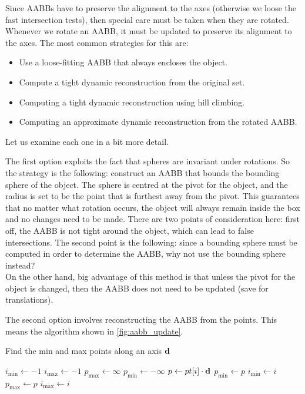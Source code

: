     Since AABBs have to preserve the alignment to the axes (otherwise we loose
    the fast intersection tests), then special care must be taken when they are
    rotated. Whenever we rotate an AABB, it must be updated to preserve its
    alignment to the axes. The most common strategies for this are:

    \begin{itemize}
      \item Use a loose-fitting AABB that always encloses the object.
      \item Compute a tight dynamic reconstruction from the original set.
      \item Computing a tight dynamic reconstruction using hill climbing.
      \item Computing an approximate dynamic reconstruction from the
        rotated AABB.
    \end{itemize}
    Let us examine each one in a bit more detail.

    The first option exploits the fact that spheres are invariant under
    rotations. So the strategy is the following: construct an AABB that bounds
    the bounding sphere of the object. The sphere is centred at the pivot for
    the object, and the radius is set to be the point that is furthest away from
    the pivot. This guarantees that no matter what rotation occurs, the object
    will always remain inside the box and no changes need to be made. There are
    two points of consideration here: first off, the AABB is not tight around
    the object, which can lead to false intersections. The second point is the
    following: since a bounding sphere must be computed in order to determine
    the AABB, why not use the bounding sphere instead? \\
    On the other hand, big advantage of this method is that unless the pivot for
    the object is changed, then the AABB does not need to be updated (save for
    translations).

    The second option involves reconstructing the AABB from the points. This
    means the algorithm shown in \ref{fig:aabb_update}.
    \begin{algorithm}
      \caption{Find the min and max points along an axis ${\mathbf d }$}
      \label{fig:aabb_update}
      \begin{algorithmic}
        \State $i_{\min} \gets -1$
        \State $i_{\max} \gets -1$
        \State $p_{\max} \gets \infty$
        \State $p_{\min} \gets -\infty$
          \State $p \gets pt[i] \cdot {\mathbf d }$
            \State $p_{\min} \gets p$
            \State $i_{\min} \gets i$
          \EndIf
            \State $p_{\max} \gets p$
            \State $i_{\max} \gets i$
          \EndIf
        \EndFor
      \end{algorithmic}
    \end{algorithm}

